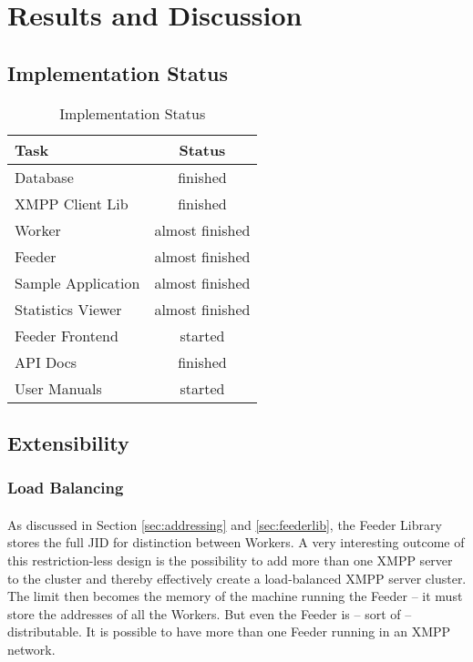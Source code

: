 \section{Results and Discussion}
\label{sec:discussion}

\subsection{Implementation Status}

\begin{table}[H]
\begin{tabularx}{\linewidth}{lc}
\toprule
\textbf{Task} & \textbf{Status} \\
\midrule
\endhead
Database           & finished \\
XMPP Client Lib    & finished \\
Worker             & almost finished \\
Feeder             & almost finished \\
Sample Application & almost finished \\
Statistics Viewer  & almost finished \\
Feeder Frontend    & started \\
API Docs           & finished \\
User Manuals       & started \\
\bottomrule
\end{tabularx}
\caption{Implementation Status}
\label{tab:impstatus}
\end{table}


\subsection{Extensibility}
\label{sec:extensibility}

\subsubsection{Load Balancing}
\paragraph{}
As discussed in Section \ref{sec:addressing} and \ref{sec:feederlib}, the Feeder Library stores the full JID for distinction between Workers. A very interesting outcome of this restriction-less design is the possibility to add more than one XMPP server to the cluster and thereby effectively create a load-balanced XMPP server cluster. The limit then becomes the memory of the machine running the Feeder -- it must store the addresses of all the Workers. But even the Feeder is -- sort of -- distributable. It is possible to have more than one Feeder running in an XMPP network.

